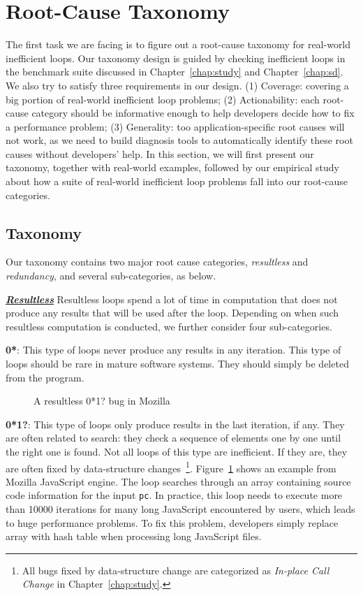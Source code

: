 \section{Root-Cause Taxonomy}
\label{sec:6_study}

The first task we are facing is to figure out a root-cause taxonomy for
real-world inefficient loops. 
Our taxonomy design is guided by checking inefficient loops 
in the benchmark suite discussed in Chapter~\ref{chap:study} and Chapter~\ref{chap:sd}. 
We also try to satisfy three requirements in our design.
(1) Coverage: covering
a big portion of real-world inefficient loop problems; 
(2) Actionability: each root-cause category should be informative enough 
to help developers
decide how to fix a performance problem; 
(3) Generality: too application-specific root causes will not work, as we
need to build diagnosis tools to automatically identify these root causes 
without developers' help.
In this section, we will first present our taxonomy, together with real-world
examples, followed by our empirical study about how a suite of real-world 
inefficient
loop problems fall into our root-cause categories.


\subsection{Taxonomy}
\label{sec:6_study_tax}
Our taxonomy contains two major root cause categories,
\textit{resultless} and \textit{redundancy}, and several sub-categories, 
as below.

\underline{\textit{\textbf{Resultless}}}
Resultless loops spend a lot of time in computation that does not 
produce any results that will be used after the loop.
Depending on when such resultless computation is conducted, we further
consider four sub-categories.

{\textbf{0*}}: 
This type of loops never produce any results in any iteration.
This type of loops should be rare in mature software systems.
They should simply be deleted from the program.

\begin{figure}
\caption{A resultless 0*1? bug in Mozilla}
\label{fig:Mozilla347306}
\end{figure}

{\textbf{0*1?}}:
This type of loops only produce results in the last iteration, if any. 
They are often related to search: they check a sequence of elements one
by one until the right one is found.
Not all loops of this type are inefficient. If they are, they are often
fixed by data-structure changes~\footnote{All bugs fixed by data-structure change 
are categorized as \emph{In-place Call Change} in Chapter~\ref{chap:study}.}.
Figure~\ref{fig:Mozilla347306} shows an example from Mozilla
JavaScript engine. 
The loop searches through an array containing source code information for the input \texttt{pc}. 
In practice, this loop needs to execute more than 10000 iterations for 
many long JavaScript encountered by users, which leads to huge 
performance problems. To fix this problem, 
developers simply replace array with hash table when processing long
JavaScript files.

